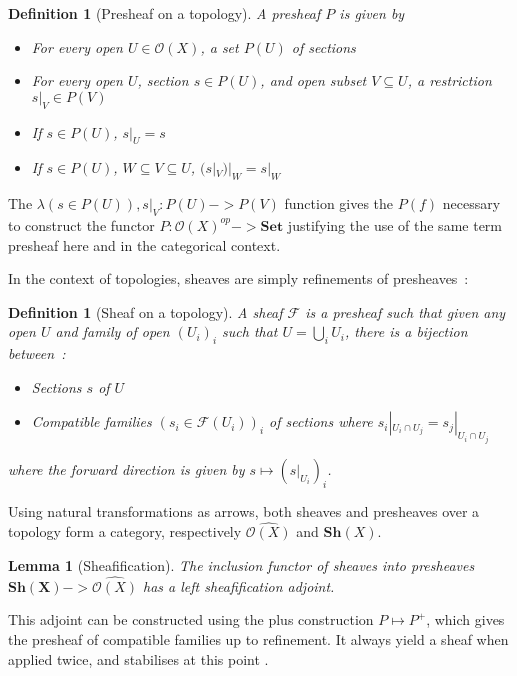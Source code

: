\documentclass[11pt]{article}
\newtheorem{lemma}[theorem]{Lemma}
\newtheorem{definition}[theorem]{Definition}
\newcommand{\0}{\mathbf{0}}
\newcommand{\1}{\mathbf{1}}
\begin{document}
\begin{definition}[Presheaf on a topology]
    A \emph{presheaf} $P$ is given by
    \begin{itemize}
        \item For every open $U \in \mathcal{O}(X)$, a set $P(U)$ of \emph{sections}
        \item For every open $U$, section $s\in P(U)$, and open subset $V\subseteq U$, a \emph{restriction} $s|_V\in P(V)$
        \item If $s\in P(U)$, $s|_U = s$
        \item If $s\in P(U)$, $W\subseteq V \subseteq U$, $(s|_V)|_W = s|_W$
    \end{itemize}
\end{definition}
The $\lambda (s\in P(U)), s|_V : P(U) -> P(V)$ function gives the $P(f)$ necessary to construct the functor $P : \mathcal{O}(X)^{op} -> \mathbf{Set}$ justifying the use of the same term presheaf here and in the categorical context.

In the context of topologies, sheaves are simply refinements of presheaves~:
\begin{definition}[Sheaf on a topology]
    A \emph{sheaf} $\mathcal{F}$ is a presheaf such that given any open  $U$ and family of open $(U_i)_i$ such that $U = \bigcup_i U_i$, there is a bijection between~:
    \begin{itemize}
        \item Sections $s$ of $U$
        \item \emph{Compatible} families $(s_i\in \mathcal{F}(U_i))_i$ of sections where $s_i|_{U_i\cap U_j} = s_j|_{U_i\cap U_j}$
    \end{itemize}
    where the forward direction is given by $s \mapsto (s|_{U_i})_i$.
\end{definition}

Using natural transformations as arrows, both sheaves and presheaves over a topology form a category, respectively $\widehat{\mathcal{O}(X)}$ and $\mathbf{Sh}(X)$.
\begin{lemma}[Sheafification]
    The inclusion functor of sheaves into presheaves $\mathbf{Sh(X)} -> \widehat{\mathcal{O}(X)}$ has a left \emph{sheafification} adjoint.
\end{lemma}

This adjoint can be constructed using the plus construction $P \mapsto P^{+}$, which gives the presheaf of compatible families up to refinement.
It always yield a sheaf when applied twice, and stabilises at this point \cite{maclane2012sheaves}.
\end{document}
